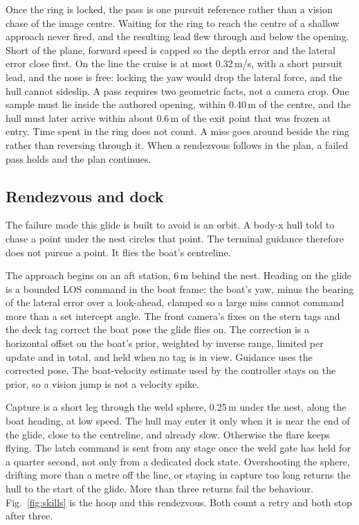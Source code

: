 \documentclass[conference]{IEEEtran}
\begin{document}
Once the ring is locked, the pass is one pursuit reference rather than a vision chase of the image centre. Waiting for the ring to reach the centre of a shallow approach never fired, and the resulting lead flew through and below the opening. Short of the plane, forward speed is capped so the depth error and the lateral error close first. On the line the cruise is at most 0.32\,m/s, with a short pursuit lead, and the nose is free: locking the yaw would drop the lateral force, and the hull cannot sideslip. A pass requires two geometric facts, not a camera crop. One sample must lie inside the authored opening, within 0.40\,m of the centre, and the hull must later arrive within about 0.6\,m of the exit point that was frozen at entry. Time spent in the ring does not count. A miss goes around beside the ring rather than reversing through it. When a rendezvous follows in the plan, a failed pass holds and the plan continues.

\subsection{Rendezvous and dock}
The failure mode this glide is built to avoid is an orbit. A body-x hull told to chase a point under the nest circles that point. The terminal guidance therefore does not pursue a point. It flies the boat's centreline.

The approach begins on an aft station, 6\,m behind the nest. Heading on the glide is a bounded LOS command in the boat frame: the boat's yaw, minus the bearing of the lateral error over a look-ahead, clamped so a large miss cannot command more than a set intercept angle. The front camera's fixes on the stern tags and the deck tag correct the boat pose the glide flies on. The correction is a horizontal offset on the boat's prior, weighted by inverse range, limited per update and in total, and held when no tag is in view. Guidance uses the corrected pose. The boat-velocity estimate used by the controller stays on the prior, so a vision jump is not a velocity spike.

Capture is a short leg through the weld sphere, 0.25\,m under the nest, along the boat heading, at low speed. The hull may enter it only when it is near the end of the glide, close to the centreline, and already slow. Otherwise the flare keeps flying. The latch command is sent from any stage once the weld gate has held for a quarter second, not only from a dedicated dock state. Overshooting the sphere, drifting more than a metre off the line, or staying in capture too long returns the hull to the start of the glide. More than three returns fail the behaviour. Fig.~\ref{fig:skills} is the hoop and this rendezvous. Both count a retry and both stop after three.
\end{document}
